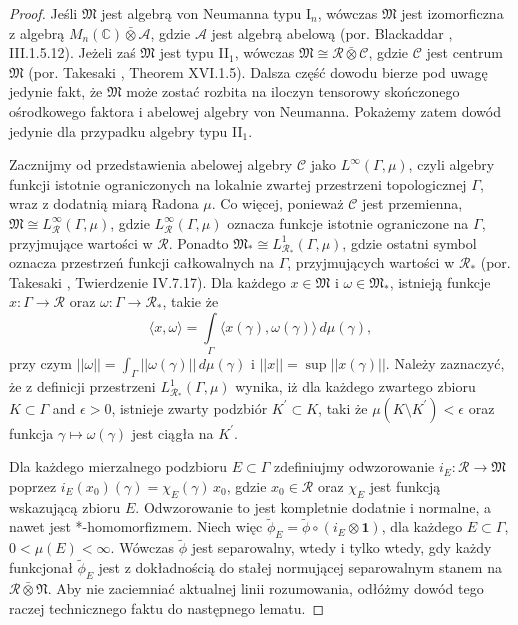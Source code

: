 \begin{proof}
Jeśli $\mathfrak{M}$ jest algebrą von Neumanna typu I$\phantom{}_{n}$,
wówczas $\mathfrak{M}$ jest izomorficzna z algebrą
$M_{n}(\mathbb{C}) \bar{\otimes} \mathcal{A}$,
gdzie $\mathcal{A}$ jest algebrą abelową
(por. Blackaddar \cite{Blackadar2006}, III.1.5.12).
Jeżeli zaś $\mathfrak{M}$ jest typu II$\phantom{}_{1}$,
wówczas $\mathfrak{M} \cong  \mathcal{R}\bar{\otimes}\mathcal{C}$,
gdzie $\mathcal{C}$ jest centrum $\mathfrak{M}$
(por. Takesaki \cite{Takesaki3}, Theorem XVI.1.5).
Dalsza część dowodu bierze pod uwagę jedynie fakt, że $\mathfrak{M}$
może zostać rozbita na iloczyn tensorowy skończonego ośrodkowego faktora i
abelowej algebry von Neumanna.
Pokażemy zatem dowód jedynie dla przypadku algebry typu II$\phantom{}_{1}$.

Zacznijmy od przedstawienia abelowej algebry $\mathcal{C}$ jako
$L^{\infty}(\Gamma, \mu)$, czyli algebry funkcji istotnie ograniczonych
na lokalnie zwartej przestrzeni topologicznej $\Gamma$,
wraz z dodatnią miarą Radona $\mu$.
Co więcej, ponieważ $\mathcal{C}$ jest przemienna,
$\mathfrak{M} \cong L^{\infty}_{\mathcal{R}}(\Gamma, \mu)$,
gdzie $L^{\infty}_{\mathcal{R}}(\Gamma, \mu)$  oznacza
funkcje istotnie ograniczone na $\Gamma$, przyjmujące wartości w $\mathcal{R}$.
Ponadto $\mathfrak{M}_{*} \cong L^{1}_{\mathcal{R}_{*}}(\Gamma, \mu)$,
gdzie ostatni symbol oznacza
przestrzeń funkcji całkowalnych na $\Gamma$, przyjmujących wartości w $\mathcal{R}_{*}$
(por. Takesaki \cite{Takesaki1}, Twierdzenie IV.7.17).
Dla każdego $x \in \mathfrak{M}$ i $\omega \in \mathfrak{M}_{*}$,
istnieją funkcje $x:\Gamma\to\mathcal{R}$ oraz
$\omega:\Gamma\to\mathcal{R}_{*}$, takie że
\begin{equation}
\langle x, \omega \rangle =\int \limits_{\Gamma}
\langle x(\gamma), \omega(\gamma) \rangle \, d \mu(\gamma),
\end{equation}
przy czym $||\omega|| = \int_{\Gamma} ||\omega(\gamma)|| \, d \mu(\gamma)$
i $||x|| = \sup || x(\gamma) ||$.
Należy zaznaczyć, że z definicji przestrzeni $L^{1}_{\mathcal{R}_{*}}(\Gamma, \mu)$
wynika, iż dla każdego zwartego zbioru
$K \subset \Gamma$ and $\epsilon >0$,
istnieje zwarty podzbiór $K^{'} \subset K$,
taki że $\mu (K \setminus K^{'}) < \epsilon$
oraz funkcja $\gamma \mapsto \omega(\gamma)$ jest ciągła na $K^{'}$.

Dla każdego mierzalnego podzbioru $E \subset \Gamma$
zdefiniujmy odwzorowanie
$i_{E}: \mathcal{R} \rightarrow \mathfrak{M}$ poprzez
$i_{E}(x_{0})(\gamma) = \chi_{E}(\gamma) \, x_{0}$,
gdzie $x_{0} \in \mathcal{R}$
oraz $\chi_{E}$ jest funkcją wskazującą zbioru $E$.
Odwzorowanie to jest kompletnie dodatnie i normalne,
a nawet jest *-homomorfizmem.
Niech więc $\tilde{\phi}_{E} = \tilde{\phi} \circ (i_{E} \otimes \mathbf{1})$,
dla każdego $E \subset \Gamma$, $0<\mu(E)<\infty$.
Wówczas $\tilde{\phi}$ jest separowalny, wtedy i tylko wtedy, gdy
każdy funkcjonał $\tilde{\phi}_{E}$ jest z dokładnością do stałej
normującej separowalnym stanem na $\mathcal{R} \bar{\otimes} \mathfrak{N}$.
Aby nie zaciemniać aktualnej linii rozumowania,
odłóżmy dowód tego raczej technicznego faktu do następnego lematu.


\end{proof}
